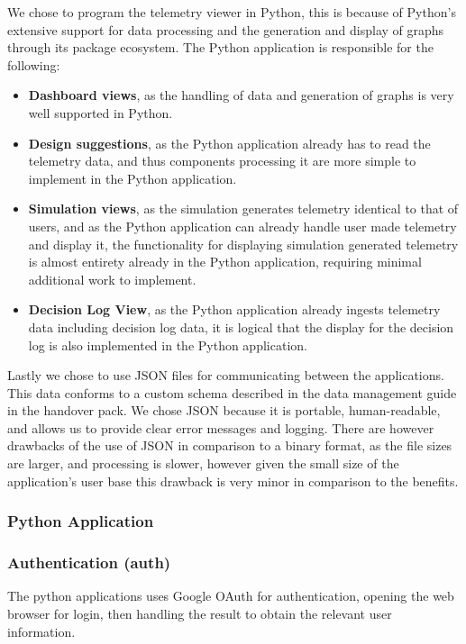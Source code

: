 We chose to program the telemetry viewer in Python, this is because of Python's extensive support for data processing and the generation and display of graphs through its package ecosystem. The Python application is responsible for the following:
\begin{itemize}
  \item \textbf{Dashboard views}, as the handling of data and generation of graphs is very well supported in Python.
  \item \textbf{Design suggestions}, as the Python application already has to read the telemetry data, and thus components processing it are more simple to implement in the Python application.
  \item \textbf{Simulation views}, as the simulation generates telemetry identical to that of users, and as the Python application can already handle user made telemetry and display it, the functionality for displaying simulation generated telemetry is almost entirety already in the Python application, requiring minimal additional work to implement.
  \item \textbf{Decision Log View}, as the Python application already ingests telemetry data including decision log data, it is logical that the display for the decision log is also implemented in the Python application.
\end{itemize}

Lastly we chose to use JSON files for communicating between the applications. This data conforms to a custom schema described in the data management guide in the handover pack. We chose JSON because it is portable, human-readable, and allows us to provide clear error messages and logging. There are however drawbacks of the use of JSON in comparison to a binary format, as the file sizes are larger, and processing is slower, however given the small size of the application's user base this drawback is very minor in comparison to the benefits.

\subsubsection{Python Application}

\subsubsection{Authentication (auth)}
\label{sec: python_auth}
The python applications uses Google OAuth for authentication, opening the web browser for login, then handling the result to obtain the relevant user information.

